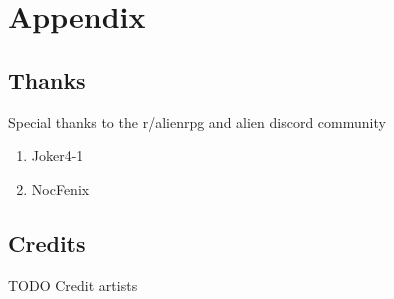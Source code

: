 \chapter{Appendix}

  


\section{Thanks}

\begin{rpg-commentbox}{Special thanks to the r/alienrpg and alien discord community}
    
    \begin{enumerate}
        \item Joker4-1
        \item NocFenix
    \end{enumerate}
\end{rpg-commentbox} 

\section{Credits}

\begin{rpg-warnbox}{TODO}
    Credit artists
\end{rpg-warnbox}

